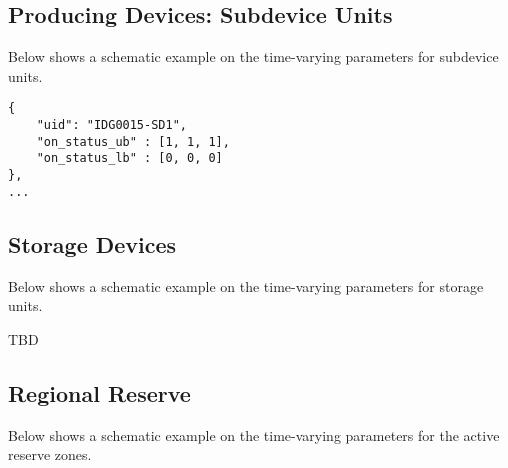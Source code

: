 \subsection{Producing Devices: Subdevice Units}
\label{sec:subdevice_time}
Below shows a schematic example on the time-varying parameters for subdevice units.
\begin{verbatim}
{
    "uid": "IDG0015-SD1",
    "on_status_ub" : [1, 1, 1],
    "on_status_lb" : [0, 0, 0]
},
...
\end{verbatim}

\subsection{Storage Devices}
\label{sec:storage_time}
Below shows a schematic example on the time-varying parameters for storage units.
\begin{todo}[]{}
TBD
\end{todo}

\subsection{Regional Reserve}
\label{sec:reserve_time}
Below shows a schematic example on the time-varying parameters for the active reserve zones.

